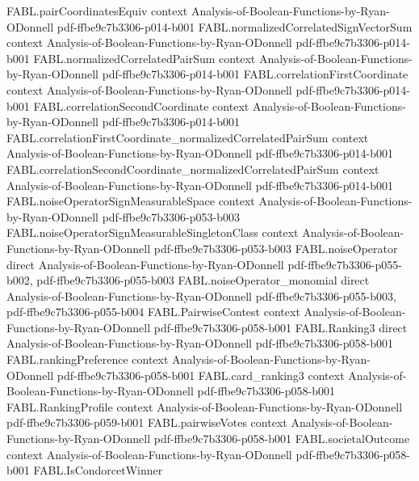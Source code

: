 \begin{theorem}
\proofstep
  {FABL.pairCoordinatesEquiv}
  {context}
  {Analysis-of-Boolean-Functions-by-Ryan-ODonnell}
  {pdf-ffbe9c7b3306-p014-b001}
\proofstep
  {FABL.normalizedCorrelatedSignVectorSum}
  {context}
  {Analysis-of-Boolean-Functions-by-Ryan-ODonnell}
  {pdf-ffbe9c7b3306-p014-b001}
\proofstep
  {FABL.normalizedCorrelatedPairSum}
  {context}
  {Analysis-of-Boolean-Functions-by-Ryan-ODonnell}
  {pdf-ffbe9c7b3306-p014-b001}
\proofstep
  {FABL.correlationFirstCoordinate}
  {context}
  {Analysis-of-Boolean-Functions-by-Ryan-ODonnell}
  {pdf-ffbe9c7b3306-p014-b001}
\proofstep
  {FABL.correlationSecondCoordinate}
  {context}
  {Analysis-of-Boolean-Functions-by-Ryan-ODonnell}
  {pdf-ffbe9c7b3306-p014-b001}
\proofstep
  {FABL.correlationFirstCoordinate_normalizedCorrelatedPairSum}
  {context}
  {Analysis-of-Boolean-Functions-by-Ryan-ODonnell}
  {pdf-ffbe9c7b3306-p014-b001}
\proofstep
  {FABL.correlationSecondCoordinate_normalizedCorrelatedPairSum}
  {context}
  {Analysis-of-Boolean-Functions-by-Ryan-ODonnell}
  {pdf-ffbe9c7b3306-p014-b001}
\proofstep
  {FABL.noiseOperatorSignMeasurableSpace}
  {context}
  {Analysis-of-Boolean-Functions-by-Ryan-ODonnell}
  {pdf-ffbe9c7b3306-p053-b003}
\proofstep
  {FABL.noiseOperatorSignMeasurableSingletonClass}
  {context}
  {Analysis-of-Boolean-Functions-by-Ryan-ODonnell}
  {pdf-ffbe9c7b3306-p053-b003}
\proofstep
  {FABL.noiseOperator}
  {direct}
  {Analysis-of-Boolean-Functions-by-Ryan-ODonnell}
  {pdf-ffbe9c7b3306-p055-b002,
    pdf-ffbe9c7b3306-p055-b003}
\proofstep
  {FABL.noiseOperator_monomial}
  {direct}
  {Analysis-of-Boolean-Functions-by-Ryan-ODonnell}
  {pdf-ffbe9c7b3306-p055-b003,
    pdf-ffbe9c7b3306-p055-b004}
\proofstep
  {FABL.PairwiseContest}
  {context}
  {Analysis-of-Boolean-Functions-by-Ryan-ODonnell}
  {pdf-ffbe9c7b3306-p058-b001}
\proofstep
  {FABL.Ranking3}
  {direct}
  {Analysis-of-Boolean-Functions-by-Ryan-ODonnell}
  {pdf-ffbe9c7b3306-p058-b001}
\proofstep
  {FABL.rankingPreference}
  {context}
  {Analysis-of-Boolean-Functions-by-Ryan-ODonnell}
  {pdf-ffbe9c7b3306-p058-b001}
\proofstep
  {FABL.card_ranking3}
  {context}
  {Analysis-of-Boolean-Functions-by-Ryan-ODonnell}
  {pdf-ffbe9c7b3306-p058-b001}
\proofstep
  {FABL.RankingProfile}
  {context}
  {Analysis-of-Boolean-Functions-by-Ryan-ODonnell}
  {pdf-ffbe9c7b3306-p059-b001}
\proofstep
  {FABL.pairwiseVotes}
  {context}
  {Analysis-of-Boolean-Functions-by-Ryan-ODonnell}
  {pdf-ffbe9c7b3306-p058-b001}
\proofstep
  {FABL.societalOutcome}
  {context}
  {Analysis-of-Boolean-Functions-by-Ryan-ODonnell}
  {pdf-ffbe9c7b3306-p058-b001}
\proofstep
  {FABL.IsCondorcetWinner}

\end{theorem}
